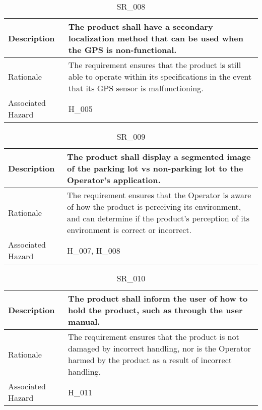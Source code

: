 \documentclass{article}
\begin{document}
\begin{table}[!h]
\begin{center}
\caption {SR\_008} 
\label{SR_008}
\begin{tabular}{ | m{3cm} | m{11cm} | }
\hline
Description & The product shall have a secondary localization method that can be used when the GPS is non-functional. \\
\hline
Rationale & The requirement ensures that the product is still able to operate within its specifications in the event that its GPS sensor is malfunctioning. \\
\hline
Associated Hazard & H\_005 \\
\hline
\end{tabular}
\end{center}
\end{table}

\begin{table}[!h]
\begin{center}
\caption {SR\_009} 
\label{SR_009}
\begin{tabular}{ | m{3cm} | m{11cm} | }
\hline
Description & The product shall display a segmented image of the parking lot vs non-parking lot to the Operator's application. \\
\hline
Rationale & The requirement ensures that the Operator is aware of how the product is perceiving its environment, and can determine if the product's perception of its environment is correct or incorrect. \\
\hline
Associated Hazard & H\_007, H\_008 \\
\hline
\end{tabular}
\end{center}
\end{table}

\begin{table}[!h]
\begin{center}
\caption {SR\_010} 
\label{SR_010}
\begin{tabular}{ | m{3cm} | m{11cm} | }
\hline
Description & The product shall inform the user of how to hold the product, such as through the user manual. \\
\hline
Rationale & The requirement ensures that the product is not damaged by incorrect handling, nor is the Operator harmed by the product as a result of incorrect handling. \\
\hline
Associated Hazard & H\_011 \\
\hline
\end{tabular}
\end{center}
\end{table}
\end{document}
